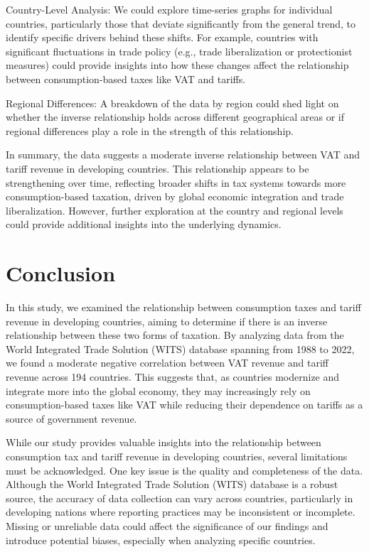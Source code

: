 \documentclass[12pt]{article}
\begin{document}
Country-Level Analysis: We could explore time-series graphs for individual countries, particularly those that deviate significantly from the general trend, to identify specific drivers behind these shifts. For example, countries with significant fluctuations in trade policy (e.g., trade liberalization or protectionist measures) could provide insights into how these changes affect the relationship between consumption-based taxes like VAT and tariffs.

Regional Differences: A breakdown of the data by region could shed light on whether the inverse relationship holds across different geographical areas or if regional differences play a role in the strength of this relationship.

In summary, the data suggests a moderate inverse relationship between VAT and tariff revenue in developing countries. This relationship appears to be strengthening over time, reflecting broader shifts in tax systems towards more consumption-based taxation, driven by global economic integration and trade liberalization. However, further exploration at the country and regional levels could provide additional insights into the underlying dynamics.

\section{Conclusion}
\label{sec:conclusion}

In this study, we examined the relationship between consumption taxes and tariff revenue in developing countries, aiming to determine if there is an inverse relationship between these two forms of taxation. By analyzing data from the World Integrated Trade Solution (WITS) database spanning from 1988 to 2022, we found a moderate negative correlation between VAT revenue and tariff revenue across 194 countries. This suggests that, as countries modernize and integrate more into the global economy, they may increasingly rely on consumption-based taxes like VAT while reducing their dependence on tariffs as a source of government revenue.

While our study provides valuable insights into the relationship between consumption tax and tariff revenue in developing countries, several limitations must be acknowledged. One key issue is the quality and completeness of the data. Although the World Integrated Trade Solution (WITS) database is a robust source, the accuracy of data collection can vary across countries, particularly in developing nations where reporting practices may be inconsistent or incomplete. Missing or unreliable data could affect the significance of our findings and introduce potential biases, especially when analyzing specific countries. 
\end{document}
